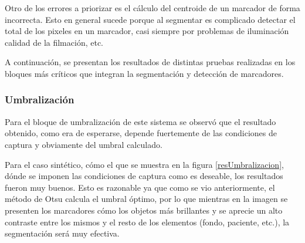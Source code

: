 Otro de los errores a priorizar es el cálculo del centroide de un marcador de forma incorrecta. Esto en general sucede porque al segmentar es complicado detectar el total de los pixeles en un marcador, casi siempre por problemas de iluminación calidad de la filmación, etc.

A continuación, se presentan los resultados de distintas pruebas realizadas en los bloques más críticos que integran la segmentación y detección de marcadores.

\subsubsection{Umbralización}

Para el bloque de umbralización de este sistema se observó que el resultado obtenido, como era de esperarse, depende fuertemente de las condiciones de captura y obviamente del umbral calculado. 

Para el caso sintético, cómo el que se muestra en la figura \ref{resUmbralizacion}, dónde se imponen las condiciones de captura como es deseable, los resultados fueron muy buenos. Esto es razonable ya que como se vio anteriormente, el método de Otsu\cite{otsu} calcula el umbral óptimo, por lo que mientras en la imagen se presenten los marcadores cómo los objetos más brillantes y se aprecie un alto contraste entre los mismos y el resto de los elementos (fondo, paciente, etc.), la segmentación será muy efectiva.

